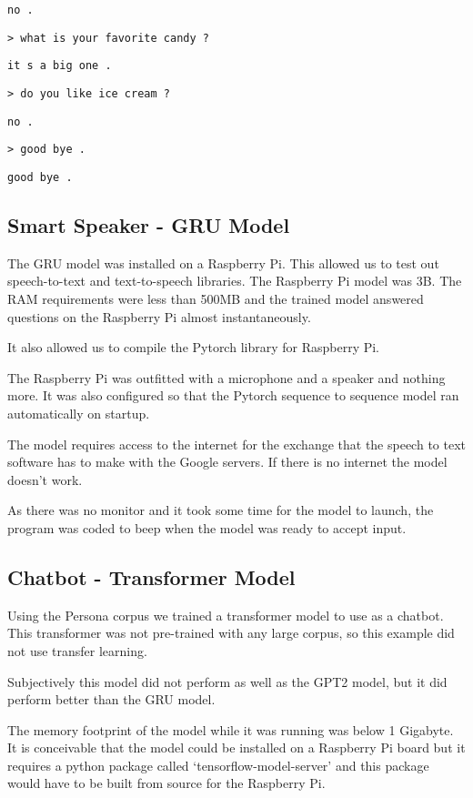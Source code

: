 \texttt{no .}

\texttt{> what is your favorite candy ?} 

\texttt{it s a big one .}

\texttt{> do you like ice cream ?} 

\texttt{no .}

\texttt{> good bye .} 

\texttt{good bye .}


\subsection{Smart Speaker - GRU Model}

The GRU model was installed on a Raspberry Pi. This allowed us to test out speech-to-text and text-to-speech libraries. The Raspberry Pi model was 3B. The RAM requirements were less than 500MB and the trained model answered questions on the Raspberry Pi almost instantaneously.

It also allowed us to compile the Pytorch library for Raspberry Pi.

The Raspberry Pi was outfitted with a microphone and a speaker and nothing more. It was also configured so that the Pytorch sequence to sequence model ran automatically on startup.

The model requires access to the internet for the exchange that the speech to text software has to make with the Google servers. If there is no internet the model doesn't work.

As there was no monitor and it took some time for the model to launch, the program was coded to beep when the model was ready to accept input.

\subsection{Chatbot - Transformer Model}
Using the Persona corpus we trained a transformer model to use as a chatbot. This transformer was not pre-trained with any large corpus, so this example did not use transfer learning. 

Subjectively this model did not perform as well as the GPT2 model, but it did perform better than the GRU model.

The memory footprint of the model while it was running was below 1 Gigabyte. It is conceivable that the model could be installed on a Raspberry Pi board but it requires a python package called `tensorflow-model-server' and this package would have to be built from source for the Raspberry Pi. 

